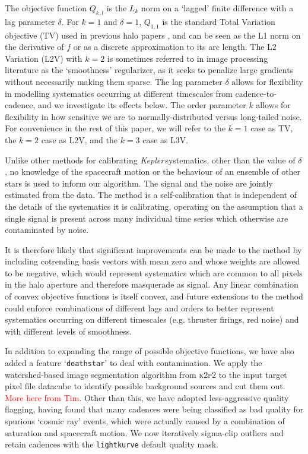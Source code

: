 \documentclass[modern]{aastex62}
\newcommand\kepler{\emph{Kepler}\,}
\begin{document}
The objective function $Q_{k,l}$ is the $L_k$ norm on a `lagged' finite difference with a lag parameter $\delta$. For $k = 1$ and $\delta = 1$, $Q_{1,1}$ is the standard Total Variation objective (TV) used in previous halo papers \citep[e.g.][]{White2017,Farr2018}, and can be seen as the L1 norm on the derivative of $f$ or as a discrete approximation to its arc length. The L2 Variation (L2V) with $k=2$ is sometimes referred to in image processing literature as the `smoothness' regularizer, as it seeks to penalize large gradients without necessarily making them sparse. The lag parameter $\delta$ allows for flexibility in modelling systematics occurring at different timescales from cadence-to-cadence, and we investigate its effects below. The order parameter $k$ allows for flexibility in how sensitive we are to normally-distributed versus long-tailed noise. For convenience in the rest of this paper, we will refer to the $k=1$ case as TV, the $k=2$ case as L2V, and the $k=3$ case as L3V.

Unlike other methods for calibrating \kepler systematics, other than the value of $\delta$, no knowledge of the spacecraft motion or the behaviour of an ensemble of other stars is used to inform our algorithm. The signal and the noise are jointly estimated from the data. The method is a self-calibration that is independent of the details of the systematics it is calibrating, operating on the assumption that a single signal is present across many individual time series which otherwise are contaminated by noise. 

It is therefore likely that significant improvements can be made to the method by including cotrending basis vectors with mean zero and whose weights are allowed to be negative, which would represent systematics which are common to all pixels in the halo aperture and therefore masquerade as signal. Any linear combination of convex objective functions is itself convex, and future extensions to the method could enforce combinations of different lags and orders to better represent systematics occurring on different timescales (e.g. thruster firings, red noise) and with different levels of smoothness.


In addition to expanding the range of possible objective functions, we have also added a feature `\texttt{deathstar}' to deal with contamination. We apply the watershed-based image segmentation algorithm from \textsc{k2p2} \citep{k2p2} to the input target pixel file datacube to identify possible background sources and cut them out. \textcolor{red}{More here from Tim.} Other than this, we have adopted less-aggressive quality flagging, having found that many cadences were being classified as bad quality for spurious `cosmic ray' events, which were actually caused by a combination of saturation and spacecraft motion. We now iteratively sigma-clip outliers and retain cadences with the \texttt{lightkurve} default quality mask.
\end{document}
